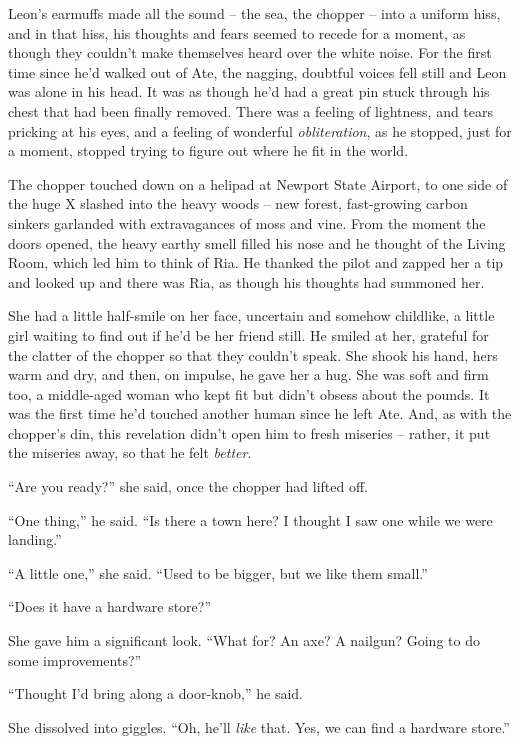Leon's earmuffs made all the sound -- the sea, the chopper -- into a 
uniform hiss, and in that hiss, his thoughts and fears seemed to recede 
for a moment, as though they couldn't make themselves heard over the 
white noise. For the first time since he'd walked out of Ate, the 
nagging, doubtful voices fell still and Leon was alone in his head. It 
was as though he'd had a great pin stuck through his chest that had 
been finally removed. There was a feeling of lightness, and tears 
pricking at his eyes, and a feeling of wonderful \emph{obliteration}, 
as he stopped, just for a moment, stopped trying to figure out where he 
fit in the world.

The chopper touched down on a helipad at Newport State Airport, to one 
side of the huge X slashed into the heavy woods -- new forest, 
fast-growing carbon sinkers garlanded with extravagances of moss and 
vine. From the moment the doors opened, the heavy earthy smell filled 
his nose and he thought of the Living Room, which led him to think of 
Ria. He thanked the pilot and zapped her a tip and looked up and there 
was Ria, as though his thoughts had summoned her.

She had a little half-smile on her face, uncertain and somehow 
childlike, a little girl waiting to find out if he'd be her friend 
still. He smiled at her, grateful for the clatter of the chopper so 
that they couldn't speak. She shook his hand, hers warm and dry, and 
then, on impulse, he gave her a hug. She was soft and firm too, a 
middle-aged woman who kept fit but didn't obsess about the pounds. It 
was the first time he'd touched another human since he left Ate. And, 
as with the chopper's din, this revelation didn't open him to fresh 
miseries -- rather, it put the miseries away, so that he felt 
\emph{better}.

“Are you ready?” she said, once the chopper had lifted off.

“One thing,” he said. “Is there a town here? I thought I saw one 
while we were landing.”

“A little one,” she said. “Used to be bigger, but we like them 
small.”

“Does it have a hardware store?”

She gave him a significant look. “What for? An axe? A nailgun? Going 
to do some improvements?”

“Thought I'd bring along a door-knob,” he said.

She dissolved into giggles. “Oh, he'll \emph{like} that. Yes, we can 
find a hardware store.”

